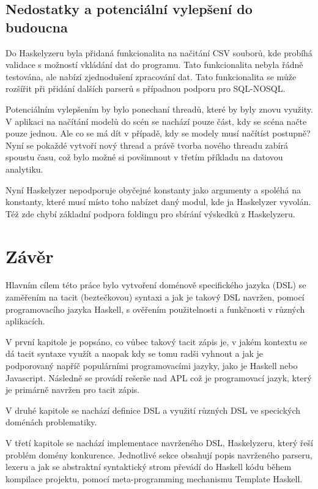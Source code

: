 \documentclass[male,czech]{kithesis}
\begin{document}
\section{Nedostatky a potenciální vylepšení do budoucna}

Do Haskelyzeru byla přidaná funkcionalita na načitání CSV souborů,
kde probíhá validace s možností vkládání dat do programu.
Tato funkcionalita nebyla řádně testována, 
ale nabízí zjednodušení zpracování dat.
Tato funkcionalita se může rozšířit při přidání dalších parserů 
s případnou podporu pro SQL-NOSQL.

Potenciálním vylepšením by bylo ponechaní threadů, 
které by byly znovu využity.
V aplikaci na načítání modelů do scén se nachází pouze část,
kdy se scéna načte pouze jednou.
Ale co se má dít v případě, 
kdy se modely musí načítíst postupně?
Nyní se pokaždé vytvoří nový thread a 
právě tvorba nového threadu zabírá spoustu času,
což bylo možné si povšimnout v třetím příkladu na datovou analytiku.

Nyní Haskelyzer nepodporuje obyčejné konstanty jako argumenty a
spoléhá na konstanty,
které musí místo toho nabízet daný modul, 
kde ja Haskelyzer vyvolán.
Též zde chybí základní podpora foldingu pro sbírání výskedků z Haskelyzeru.

\chapter{Závěr}

Hlavním cílem této práce bylo vytvoření doménově specifického jazyka (DSL) se zaměřením 
na tacit (beztečkovou) syntaxi a 
jak je takový DSL navržen, 
pomocí programovacího jazyka Haskell, 
s ověřením použitelnosti a funkčnosti v různých aplikacích.

V první kapitole je popsáno, 
co vůbec takový tacit zápis je,
v jakém kontextu se dá tacit syntaxe využít a naopak kdy se tomu radši vyhnout a
jak je podporovaný napříč populárními programovacími jazyky,
jako je Haskell nebo Javascript. 
Následně se provádí rešerše nad APL což je programovací jazyk,
který je primárně navržen pro tacit zápis.

V druhé kapitole se nachází definice DSL a
využití různých DSL ve specických doménách problematiky.

V třetí kapitole se nachází implementace navrženého DSL, 
Haskelyzeru, 
který řeší problém domény konkurence.
Jednotlivé sekce obsahují popis navrženého parseru, 
lexeru a 
jak se abstraktní syntaktický strom převádí 
do Haskell kódu během kompilace projektu, 
pomocí meta-programming mechanismu Template Haskell.
\end{document}
